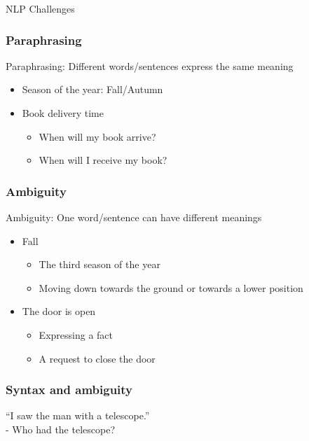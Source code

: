 \begin{frame}
  \begin{center}
    {\Large NLP Challenges}
  \end{center}
\end{frame}

\begin{frame}[fragile]\frametitle{Paraphrasing}
Paraphrasing: Different words/sentences express the same meaning
\begin{itemize}
\item Season of the year: Fall/Autumn
\item Book delivery time
	\begin{itemize}
	\item When will my book arrive?
	\item When will I receive my book?
	\end{itemize}
\end{itemize}
\end{frame}

\begin{frame}[fragile]\frametitle{Ambiguity}
Ambiguity: One word/sentence can have different meanings
\begin{itemize}
\item Fall
	\begin{itemize}
	\item The third season of the year
	\item Moving down towards the ground or towards a lower position
	\end{itemize}
\item The door is open
	\begin{itemize}
	\item Expressing a fact
	\item A request to close the door
	\end{itemize}	
\end{itemize}
\end{frame}

\begin{frame}[fragile]\frametitle{Syntax and ambiguity}


``I saw the man with a telescope.''\\
- Who had the telescope?

\end{frame}

